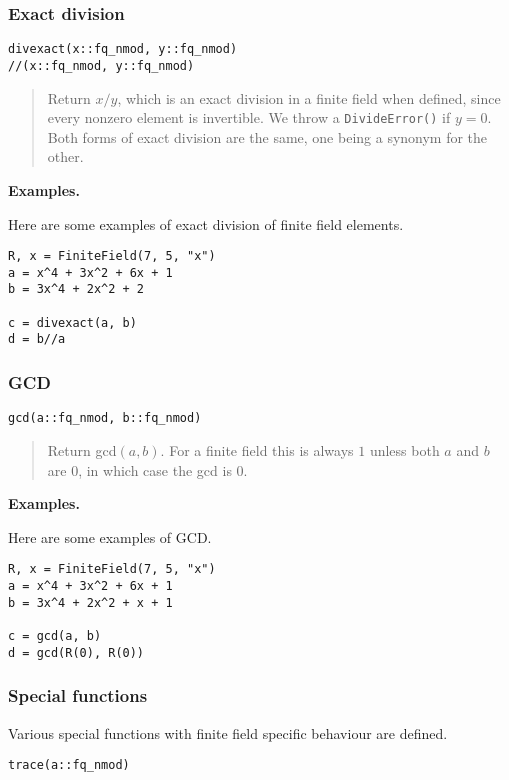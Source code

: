 \documentclass[a4paper,10pt]{article}
\newcommand{\code}{\lstinline}
\newcommand{\desc}[1]{\vspace{-3mm}\begin{quote}#1\end{quote}}
\begin{document}
{{\subsubsection{Exact division}

\begin{lstlisting}
divexact(x::fq_nmod, y::fq_nmod)
//(x::fq_nmod, y::fq_nmod)
\end{lstlisting}

\desc{Return $x/y$, which is an exact division in a finite field when defined,
since every nonzero element is invertible. We throw a \code{DivideError()} if
$y = 0$. Both forms of exact division are the same, one being a synonym for 
the other.}

\textbf{Examples.}

Here are some examples of exact division of finite field elements.

\begin{lstlisting}
R, x = FiniteField(7, 5, "x")
a = x^4 + 3x^2 + 6x + 1
b = 3x^4 + 2x^2 + 2

c = divexact(a, b)
d = b//a
\end{lstlisting}

\subsubsection{GCD}

\begin{lstlisting}
gcd(a::fq_nmod, b::fq_nmod)
\end{lstlisting}

\desc{Return gcd$(a, b)$. For a finite field this is always $1$ unless both
$a$ and $b$ are $0$, in which case the gcd is $0$.}

\textbf{Examples.}

Here are some examples of GCD.

\begin{lstlisting}
R, x = FiniteField(7, 5, "x")
a = x^4 + 3x^2 + 6x + 1
b = 3x^4 + 2x^2 + x + 1

c = gcd(a, b)
d = gcd(R(0), R(0))
\end{lstlisting}

\subsubsection{Special functions}

Various special functions with finite field specific behaviour are
defined.

\begin{lstlisting}
trace(a::fq_nmod)
\end{lstlisting}

}}
\end{document}
